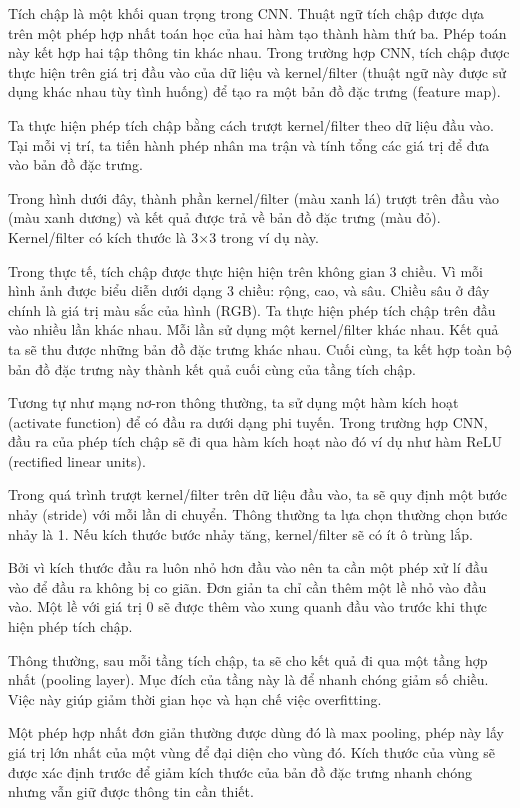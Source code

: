 	
	
	Tích chập là một khối quan trọng trong CNN. Thuật ngữ tích chập được dựa trên một phép hợp nhất toán học của hai hàm tạo thành hàm thứ ba. Phép toán này kết hợp hai tập thông tin khác nhau.
	Trong trường hợp CNN, tích chập được thực hiện trên giá trị đầu vào của dữ liệu và kernel/filter (thuật ngữ này được sử dụng khác nhau tùy tình huống) để tạo ra một bản đồ đặc trưng (feature map).
	
	
	Ta thực hiện phép tích chập bằng cách trượt kernel/filter theo dữ liệu đầu vào. Tại mỗi vị trí, ta tiến hành phép nhân ma trận và tính tổng các giá trị để đưa vào bản đồ đặc trưng.
	
	
	Trong hình dưới đây, thành phần kernel/filter (màu xanh lá) trượt trên đầu vào (màu xanh dương) và kết quả được trả về bản đồ đặc trưng (màu đỏ). Kernel/filter có kích thước là 3×3 trong ví dụ này.
	
	
	Trong thực tế, tích chập được thực hiện hiện trên không gian 3 chiều. Vì mỗi hình ảnh được biểu diễn dưới dạng 3 chiều: rộng, cao, và sâu. Chiều sâu ở đây chính là giá trị màu sắc của hình (RGB).
	Ta thực hiện phép tích chập trên đầu vào nhiều lần khác nhau. Mỗi lần sử dụng một kernel/filter khác nhau. Kết quả ta sẽ thu được những bản đồ đặc trưng khác nhau. Cuối cùng, ta kết hợp toàn bộ bản đồ đặc trưng này thành kết quả cuối cùng của tầng tích chập.
	
	Tương tự như mạng nơ-ron thông thường, ta sử dụng một hàm kích hoạt (activate function) để có đầu ra dưới dạng phi tuyến. Trong trường hợp CNN, đầu ra của phép tích chập sẽ đi qua hàm kích hoạt nào đó ví dụ như hàm ReLU (rectified linear units).
	
	Trong quá trình trượt kernel/filter trên dữ liệu đầu vào, ta sẽ quy định một bước nhảy (stride) với mỗi lần di chuyển. Thông thường ta lựa chọn thường chọn bước nhảy là 1. Nếu kích thước bước nhảy tăng, kernel/filter sẽ có ít ô trùng lắp.
	
	Bởi vì kích thước đầu ra luôn nhỏ hơn đầu vào nên ta cần một phép xử lí đầu vào để đầu ra không bị co giãn. Đơn giản ta chỉ cần thêm một lề nhỏ vào đầu vào. Một lề với giá trị 0 sẽ được thêm vào xung quanh đầu vào trước khi thực hiện phép tích chập.
	
	Thông thường, sau mỗi tầng tích chập, ta sẽ cho kết quả đi qua một tầng hợp nhất (pooling layer). Mục đích của tầng này là để nhanh chóng giảm số chiều. Việc này giúp giảm thời gian học và hạn chế việc overfitting.
	
	Một phép hợp nhất đơn giản thường được dùng đó là max pooling, phép này lấy giá trị lớn nhất của một vùng để đại diện cho vùng đó. Kích thước của vùng sẽ được xác định trước để giảm kích thước của bản đồ đặc trưng nhanh chóng nhưng vẫn giữ được thông tin cần thiết.
	
